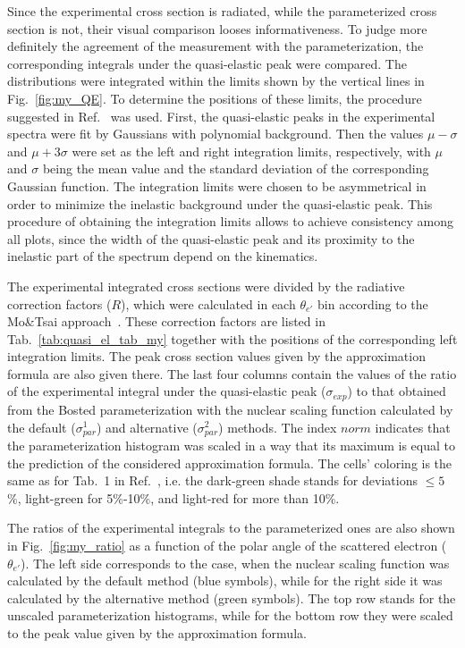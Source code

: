 Since the experimental cross section is radiated, while the parameterized cross section is not, their visual comparison looses informativeness. To judge more definitely the agreement of the measurement with the parameterization, the corresponding integrals under the quasi-elastic peak were compared. The distributions were integrated within the limits shown by the vertical lines in Fig.~\ref{fig:my_QE}. To determine the positions of these limits, the procedure suggested in Ref.~\cite{note_QE_peak} was used.  First, the quasi-elastic peaks in the experimental spectra were fit by Gaussians with polynomial background. Then the values $\mu-\sigma$ and $\mu+3\sigma$ were set as the left and right integration limits, respectively, with $\mu$ and $\sigma$ being the mean value and the standard deviation of the corresponding Gaussian function. The integration limits were chosen to be asymmetrical in order to minimize the inelastic background under the quasi-elastic peak. This procedure of obtaining the integration limits allows to achieve consistency among all plots, since the width of the quasi-elastic peak and its proximity to the inelastic part of the spectrum depend on the kinematics.

The experimental integrated cross sections were divided by the radiative correction factors ($R$), which were calculated in each $\theta_{e'}$ bin according to the Mo\&Tsai approach~\cite{Mo:1968cg}. These correction factors are listed in Tab.~\ref{tab:quasi_el_tab_my} together with the positions of the corresponding left integration limits. The peak cross section values given by the approximation formula are also given there. The last four columns contain the values of the ratio of the experimental integral under the quasi-elastic peak ($\sigma_{exp}$) to that obtained from the Bosted parameterization with the nuclear scaling function calculated by the default ($\sigma_{par}^{1}$) and alternative ($\sigma_{par}^{2}$) methods. The index $norm$ indicates that the parameterization histogram was scaled in a way that its maximum is equal to the prediction of the considered approximation formula. The cells' coloring is the same as for Tab.~1 in Ref.~\cite{note_QE_peak}, i.e. the dark-green shade stands for deviations $\leq 5$\%, light-green for 5\%-10\%, and light-red for more than 10\%.

The ratios of the experimental integrals to the parameterized ones are also shown in Fig.~\ref{fig:my_ratio} as a function of the polar angle of the scattered electron ($\theta_{e'}$). The left side corresponds to the case, when the nuclear scaling function was calculated by the default method (blue symbols), while for the right side it was calculated by the alternative method (green symbols). The top row stands for the unscaled parameterization histograms, while for the bottom row they were scaled to the peak value given by the approximation formula. 



